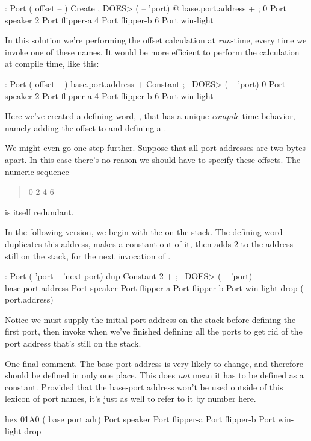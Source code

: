 \begin{Code}
: Port  ( offset -- )  Create ,
   DOES>  ( -- 'port) @ base.port.address + ;
0 Port speaker
2 Port flipper-a
4 Port flipper-b
6 Port win-light
\end{Code}
In this solution we're performing the offset calculation at
\emph{run}-time, every time we invoke one of these names. It would be
more efficient to perform the calculation at compile time, like this:

\begin{Code}
: Port  ( offset -- )  base.port.address + Constant ;
   \ DOES>  ( -- 'port)
0 Port speaker
2 Port flipper-a
4 Port flipper-b
6 Port win-light
\end{Code}
Here we've created a defining word, , that has a unique
\emph{compile}-time behavior, namely adding the offset to
 and defining a .

We might even go one step further. Suppose that all port addresses are
two bytes apart. In this case there's no reason we should have to
specify these offsets. The numeric sequence
\begin{quote}
0 2 4 6
\end{quote}
is itself redundant.

In the following version, we begin with the 
on the stack. The defining word  duplicates this address,
makes a constant out of it, then adds 2 to the address still on the
stack, for the next invocation of .

\begin{Code}
: Port   ( 'port -- 'next-port)  dup Constant  2 + ;
   \ DOES>  ( -- 'port)
base.port.address
  Port speaker
  Port flipper-a
  Port flipper-b
  Port win-light
drop ( port.address)
\end{Code}
Notice we must supply the initial port address on the stack before
defining the first port, then invoke  when we've finished
defining all the ports to get rid of the port address that's still on
the stack.

One final comment. The base-port address is very likely to change, and
therefore should be defined in only one place. This does \emph{not}
mean it has to be defined as a constant. Provided that the base-port
address won't be used outside of this lexicon of port names, it's just
as well to refer to it by number here.

\begin{Code}
hex 01A0  ( base port adr)
  Port speaker
  Port flipper-a
  Port flipper-b
  Port win-light
drop
\end{Code}

